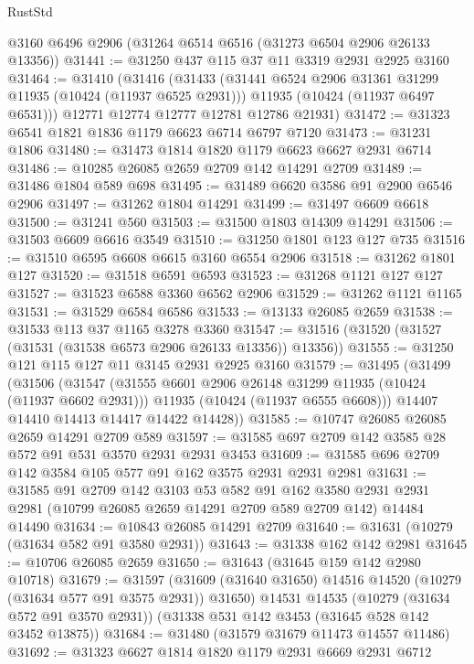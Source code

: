 \begin{lexlean}{RustStd}
\begin{coremodule}
    @3160
    @6496
    @2906
    (@31264 @6514 @6516 (@31273 @6504 @2906 @26133 @13356))
@31441 := @31250 @437 @115 @37 @11 @3319 @2931 @2925 @3160
@31464 := @31410
    (@31416
      (@31433
        (@31441 @6524 @2906 @31361 @31299 @11935 (@10424 (@11937 @6525 @2931)))
        @11935
        (@10424 (@11937 @6497 @6531)))
      @12771
      @12774
      @12777
      @12781
      @12786
      @21931)
@31472 := @31323 @6541 @1821 @1836 @1179 @6623 @6714 @6797 @7120
@31473 := @31231 @1806
@31480 := @31473 @1814 @1820 @1179 @6623 @6627 @2931 @6714
@31486 := @10285 @26085 @2659 @2709 @142 @14291 @2709
@31489 := @31486 @1804 @589 @698
@31495 := @31489 @6620 @3586 @91 @2900 @6546 @2906
@31497 := @31262 @1804 @14291
@31499 := @31497 @6609 @6618
@31500 := @31241 @560
@31503 := @31500 @1803 @14309 @14291
@31506 := @31503 @6609 @6616 @3549
@31510 := @31250 @1801 @123 @127 @735
@31516 := @31510 @6595 @6608 @6615 @3160 @6554 @2906
@31518 := @31262 @1801 @127
@31520 := @31518 @6591 @6593
@31523 := @31268 @1121 @127 @127
@31527 := @31523 @6588 @3360 @6562 @2906
@31529 := @31262 @1121 @1165
@31531 := @31529 @6584 @6586
@31533 := @13133 @26085 @2659
@31538 := @31533 @113 @37 @1165 @3278 @3360
@31547 := @31516 (@31520 (@31527 (@31531 (@31538 @6573 @2906 @26133 @13356)) @13356))
@31555 := @31250 @121 @115 @127 @11 @3145 @2931 @2925 @3160
@31579 := @31495
    (@31499
      (@31506
        (@31547
          (@31555 @6601 @2906 @26148 @31299 @11935 (@10424 (@11937 @6602 @2931)))
          @11935
          (@10424 (@11937 @6555 @6608)))
        @14407
        @14410
        @14413
        @14417
        @14422
        @14428))
@31585 := @10747 @26085 @26085 @2659 @14291 @2709 @589
@31597 := @31585 @697 @2709 @142 @3585 @28 @572 @91 @531 @3570 @2931 @2931 @3453
@31609 := @31585 @696 @2709 @142 @3584 @105 @577 @91 @162 @3575 @2931 @2931 @2981
@31631 := @31585
    @91
    @2709
    @142
    @3103
    @53
    @582
    @91
    @162
    @3580
    @2931
    @2931
    @2981
    (@10799 @26085 @2659 @14291 @2709 @589 @2709 @142)
    @14484
    @14490
@31634 := @10843 @26085 @14291 @2709
@31640 := @31631 (@10279 (@31634 @582 @91 @3580 @2931))
@31643 := @31338 @162 @142 @2981
@31645 := @10706 @26085 @2659
@31650 := @31643 (@31645 @159 @142 @2980 @10718)
@31679 := @31597
    (@31609 (@31640 @31650) @14516 @14520 (@10279 (@31634 @577 @91 @3575 @2931)) @31650)
    @14531
    @14535
    (@10279 (@31634 @572 @91 @3570 @2931))
    (@31338 @531 @142 @3453 (@31645 @528 @142 @3452 @13875))
@31684 := @31480 (@31579 @31679 @11473 @14557 @11486)
@31692 := @31323 @6627 @1814 @1820 @1179 @2931 @6669 @2931 @6712

\end{coremodule}
\end{lexlean}
